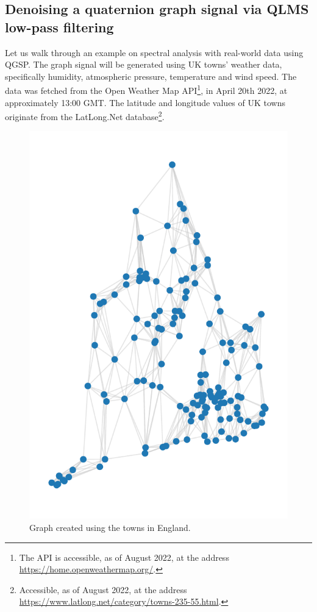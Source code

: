 \subsection{Denoising a quaternion graph signal via QLMS low-pass filtering}

Let us walk through an example on spectral analysis with real-world data using QGSP. The graph signal will be generated using UK towns' weather data, specifically humidity, atmospheric pressure, temperature and wind speed. The data was fetched from the Open Weather Map API\footnote{The API is accessible, as of August 2022, at the address \url{https://home.openweathermap.org/}.}, in April 20th 2022, at approximately 13:00 GMT. The latitude and longitude values of UK towns originate from the LatLong.Net database\footnote{Accessible, as of August 2022, at the address \url{https://www.latlong.net/category/towns-235-55.html}.}.

\begin{figure}
	\centering
	\includegraphics[width=0.3\linewidth]{thesis/Figures/uk_qgsp_graph.pdf}
	\caption{Graph created using the towns in England.}
	\label{fig:uk_graph}
\end{figure}

